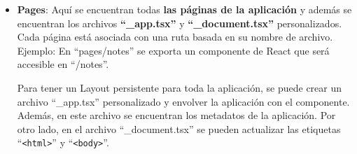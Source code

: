 \documentclass[12pt,twoside,titlepage]{report}
\begin{document}
\begin{itemize}
    \item \textbf{Pages}: Aquí se encuentran todas \textbf{las páginas de la aplicación} y además se encuentran los archivos \textbf{``\_app.tsx''} y \textbf{``\_document.tsx''} personalizados. Cada página está asociada con una ruta basada en su nombre de archivo. Ejemplo: En ``pages/notes'' se exporta un componente de React que será accesible en ``/notes''.
    
        Para tener un Layout persistente para toda la aplicación, se puede crear un archivo ``\_app.tsx'' personalizado y envolver la aplicación con el componente. Además, en este archivo se encuentran los metadatos de la aplicación. Por otro lado, en el archivo ``\_document.tsx'' se pueden actualizar las etiquetas ``\texttt{<html>}'' y ``\texttt{<body>}''.
    

\end{itemize}
\end{document}

